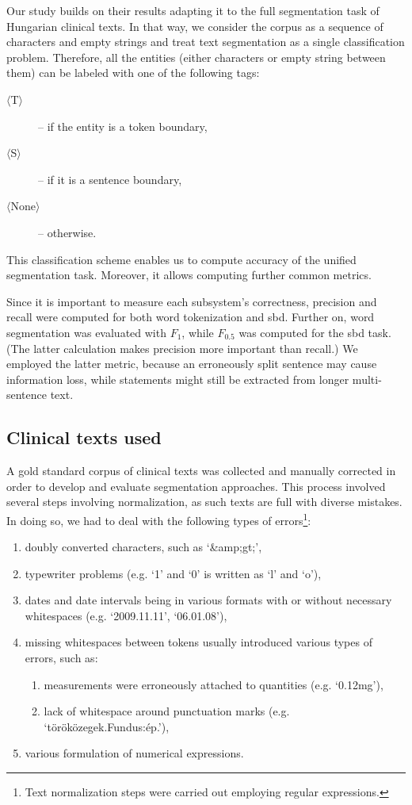 Our study builds on their results \cite{read2012sentence} adapting it to the full segmentation task of Hungarian clinical texts. 
In that way, we consider the corpus as a sequence of characters and empty strings and treat text segmentation as a single classification problem. 
Therefore, all the entities (either characters or empty string between them) can be labeled with one of the following tags: 
\begin{description}
 \item[$\langle$T$\rangle$] --  if the entity is a token boundary,
 \item[$\langle$S$\rangle$] -- if it is a sentence boundary,
 \item[$\langle$None$\rangle$] -- otherwise.
\end{description}
This classification scheme enables us to compute accuracy of the unified segmentation task. 
Moreover, it allows computing further common metrics.

Since it is important to measure each subsystem's correctness, precision and recall were computed for both word tokenization and \acrlong{sbd}. 
Further on, word segmentation was evaluated with $F_1$, while $F_{0.5}$ was computed for the \acrshort{sbd} task. 
(The latter calculation makes precision more important than recall.)
We employed the latter metric, because an erroneously split sentence may cause information loss\label{sec:loss}, while statements might still be extracted from longer multi-sentence text. 

\subsection{Clinical texts used}
\label{sec:clin_corpus}

A gold standard corpus of clinical texts was collected and manually corrected in order to develop and evaluate segmentation approaches.
This process involved several steps involving normalization, as such texts are full with diverse mistakes. 
In doing so, we had to deal with the following types of errors\footnote{Text normalization steps were carried out employing regular expressions.}:
\begin{enumerate}
 \item doubly converted characters, such as `\&amp;gt;',
 \item typewriter problems (e.g. `1' and `0' is written as `l' and `o'),
 \item dates and date intervals being in various formats with or without necessary whitespaces (e.g. `2009.11.11', `06.01.08'),
 \item missing whitespaces between tokens usually introduced various types of errors, such as:
 \begin{enumerate}
  \item measurements were erroneously attached to quantities (e.g. `0.12mg'),
  \item lack of whitespace around punctuation marks (e.g. `töröközegek.Fundus:ép.'),
 \end{enumerate}
 \item various formulation of numerical expressions.
\end{enumerate}
 
